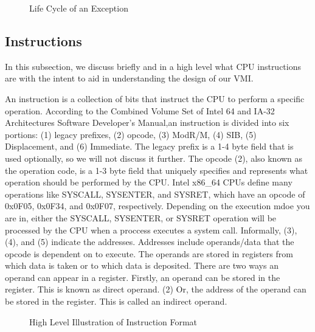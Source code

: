 \documentclass{report}
\begin{document}
\begin{spacing}{1.5}
\newpage
\vfill
\begin{figure}[ht]
  \caption{Life Cycle of an Exception}
\end{figure}

\subsection{Instructions}

{\large
In this subsection, we discuss briefly and in a high level what CPU instructions are with the intent to aid in understanding the design of our VMI.
\newline
}

{\large
An instruction is a collection of bits that instruct the CPU to perform a specific operation. According to the Combined Volume Set of Intel 64 and IA-32 Architectures Software Developer’s Manual,an instruction is divided into six portions: (1) legacy prefixes, (2) opcode, (3) ModR/M, (4) SIB, (5) Displacement, and (6) Immediate. The legacy prefix is a 1-4 byte field that is used optionally, so we will not discuss it further. The opcode (2), also known as the operation code, is a 1-3 byte field that uniquely specifies and represents what operation should be performed by the CPU. Intel x86\_64 CPUs define many operations like SYSCALL, SYSENTER, and SYSRET, which have an opcode of 0x0F05, 0x0F34, and 0x0F07, respectively. Depending on the execution mdoe you are in, either the SYSCALL, SYSENTER, or SYSRET operation will be processed by the CPU when a proccess executes a system call. Informally, (3), (4), and (5) indicate the addresses. Addresses include operands/data that the opcode is dependent on to execute. The operands are stored in registers from which data is taken or to which data is deposited. There are two ways an operand can appear in a register. Firstly, an operand can be stored in the register. This is known as direct operand. (2) Or, the address of the operand can be stored in the register. This is called an indirect operand.
\newline
}



\begin{figure}[ht]
    \centering
    \caption{High Level Illustration of Instruction Format}
\end{figure}




\end{spacing}
\end{document}
